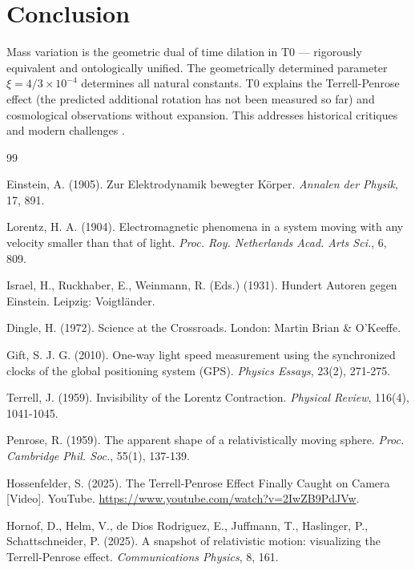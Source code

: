 		\section{Conclusion}
	
	Mass variation is the geometric dual of time dilation in T0 --- rigorously equivalent and ontologically unified. The geometrically determined parameter $\xi = 4/3 \times 10^{-4}$ determines all natural constants. T0 explains the Terrell-Penrose effect (the predicted additional rotation has not been measured so far) and cosmological observations without expansion. This addresses historical critiques \cite{hundert1931, dingle1972} and modern challenges \cite{riess2022, divalentino2021}.
	
	\begin{thebibliography}{99}
		
		Einstein, A. (1905). Zur Elektrodynamik bewegter Körper. \emph{Annalen der Physik}, 17, 891.
		
		Lorentz, H. A. (1904). Electromagnetic phenomena in a system moving with any velocity smaller than that of light. \emph{Proc. Roy. Netherlands Acad. Arts Sci.}, 6, 809.
		
		Israel, H., Ruckhaber, E., Weinmann, R. (Eds.) (1931). Hundert Autoren gegen Einstein. Leipzig: Voigtländer.
		
		Dingle, H. (1972). Science at the Crossroads. London: Martin Brian \& O'Keeffe.
		
		Gift, S. J. G. (2010). One-way light speed measurement using the synchronized clocks of the global positioning system (GPS). \emph{Physics Essays}, 23(2), 271-275.
		
		Terrell, J. (1959). Invisibility of the Lorentz Contraction. \emph{Physical Review}, 116(4), 1041-1045.
		
		Penrose, R. (1959). The apparent shape of a relativistically moving sphere. \emph{Proc. Cambridge Phil. Soc.}, 55(1), 137-139.
		
		Hossenfelder, S. (2025). The Terrell-Penrose Effect Finally Caught on Camera [Video]. YouTube. \url{https://www.youtube.com/watch?v=2IwZB9PdJVw}.
		
		Hornof, D., Helm, V., de Dios Rodriguez, E., Juffmann, T., Haslinger, P., Schattschneider, P. (2025). A snapshot of relativistic motion: visualizing the Terrell-Penrose effect. \emph{Communications Physics}, 8, 161.
		

\end{thebibliography}
